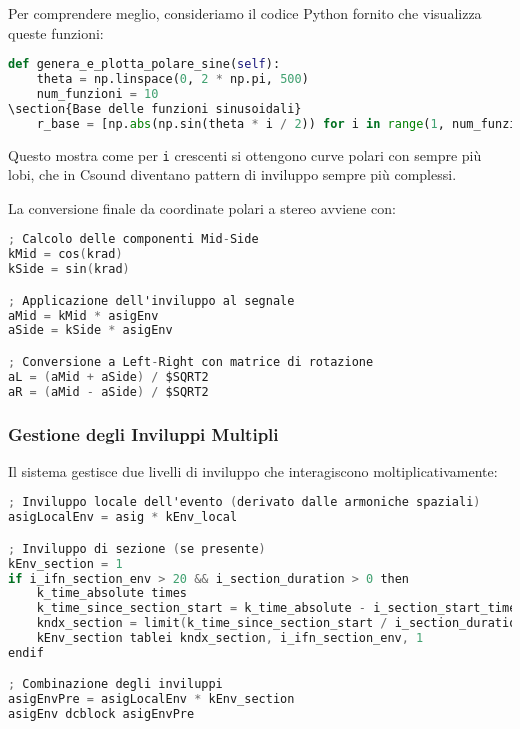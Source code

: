 Per comprendere meglio, consideriamo il codice Python fornito che visualizza queste funzioni:

\begin{lstlisting}[language=Python]
def genera_e_plotta_polare_sine(self):
    theta = np.linspace(0, 2 * np.pi, 500)
    num_funzioni = 10
\section{Base delle funzioni sinusoidali}
    r_base = [np.abs(np.sin(theta * i / 2)) for i in range(1, num_funzioni + 1)]
\end{lstlisting}

Questo mostra come per \texttt{i} crescenti si ottengono curve polari con sempre più lobi, che in Csound diventano pattern di inviluppo sempre più complessi.

La conversione finale da coordinate polari a stereo avviene con:

\begin{lstlisting}[language=C]
; Calcolo delle componenti Mid-Side
kMid = cos(krad)
kSide = sin(krad)

; Applicazione dell'inviluppo al segnale
aMid = kMid * asigEnv 
aSide = kSide * asigEnv

; Conversione a Left-Right con matrice di rotazione
aL = (aMid + aSide) / $SQRT2
aR = (aMid - aSide) / $SQRT2
\end{lstlisting}
\subsubsection{Gestione degli Inviluppi Multipli}
Il sistema gestisce due livelli di inviluppo che interagiscono moltiplicativamente:

\begin{lstlisting}[language=C]
; Inviluppo locale dell'evento (derivato dalle armoniche spaziali)
asigLocalEnv = asig * kEnv_local

; Inviluppo di sezione (se presente)
kEnv_section = 1
if i_ifn_section_env > 20 && i_section_duration > 0 then
    k_time_absolute times      
    k_time_since_section_start = k_time_absolute - i_section_start_time
    kndx_section = limit(k_time_since_section_start / i_section_duration, 0, 1)
    kEnv_section tablei kndx_section, i_ifn_section_env, 1
endif

; Combinazione degli inviluppi
asigEnvPre = asigLocalEnv * kEnv_section
asigEnv dcblock asigEnvPre
\end{lstlisting}

